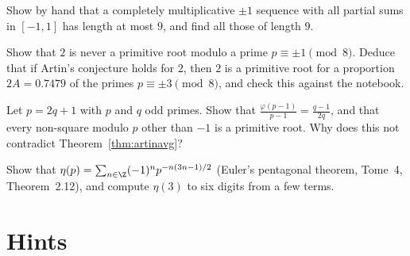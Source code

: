 \begin{exercise}[$\star\star$]\label{ex:multone}
Show by hand that a completely multiplicative $\pm1$ sequence with all partial sums in $[-1,1]$ has length at most $9$, and find all those of length $9$.
\end{exercise}

\begin{exercise}[$\star$]\label{ex:artinmod8}
Show that $2$ is never a primitive root modulo a prime $p\equiv\pm1\pmod8$. Deduce that if Artin's conjecture holds for $2$, then $2$ is a primitive root for a
proportion $2A=0.7479$ of the primes $p\equiv\pm3\pmod8$, and check this against the notebook.
\end{exercise}

\begin{exercise}[$\star\star$]\label{ex:artinsg}
Let $p=2q+1$ with $p$ and $q$ odd primes. Show that $\frac{\varphi(p-1)}{p-1}=\frac{q-1}{2q}$, and that every non-square modulo $p$ other than $-1$ is a primitive root.
Why does this not contradict Theorem~\ref{thm:artinavg}?
\end{exercise}

\begin{exercise}[$\star$]\label{ex:etapent}
Show that $\eta(p)=\sum_{n\in\Z}(-1)^np^{-n(3n-1)/2}$ (Euler's pentagonal theorem, Tome~4, Theorem~2.12), and compute $\eta(3)$ to six digits from a few terms.
\end{exercise}

\section{Hints}

